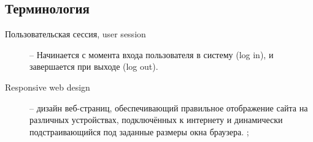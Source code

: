 \subsection{Терминология}
\begin{description}

\item[Пользовательская сессия, user session] -- 
    Начинается с момента входа пользователя в систему (log in), и завершается при выходе (log out).
\item[Responsive web design] -- дизайн веб-страниц, обеспечивающий правильное отображение сайта на 
различных устройствах, подключённых к интернету и динамически подстраивающийся под заданные размеры 
окна браузера. \cite{wiki_adaptive};
\end{description}

